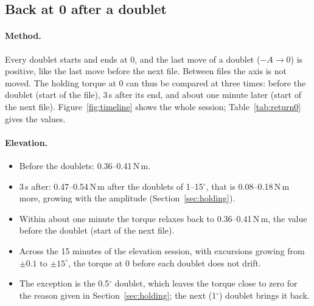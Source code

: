 \documentclass[10pt,a4paper]{article}
\numberwithin{equation}{section}
\begin{document}
\subsection{Back at 0 after a doublet}\label{sec:return}
\paragraph{Method.} Every doublet starts and ends at 0, and the last move of a doublet ($-A\to0$) is positive, like the last move before the next file. Between files the axis is not moved. The holding torque at 0 can thus be compared at three times: before the doublet (start of the file), 3\,s after its end, and about one minute later (start of the next file). Figure~\ref{fig:timeline} shows the whole session; Table~\ref{tab:return0} gives the values.
\paragraph{Elevation.}
\begin{itemize}
\item Before the doublets: 0.36--0.41\,N\,m.
\item 3\,s after: 0.47--0.54\,N\,m after the doublets of 1--15$^\circ$, that is 0.08--0.18\,N\,m more, growing with the amplitude (Section~\ref{sec:holding}).
\item Within about one minute the torque relaxes back to 0.36--0.41\,N\,m, the value before the doublet (start of the next file).
\item Across the 15 minutes of the elevation session, with excursions growing from $\pm0.1$ to $\pm15^\circ$, the torque at 0 before each doublet does not drift.
\item The exception is the 0.5$^\circ$ doublet, which leaves the torque close to zero for the reason given in Section~\ref{sec:holding}; the next (1$^\circ$) doublet brings it back.
\end{itemize}
\end{document}
